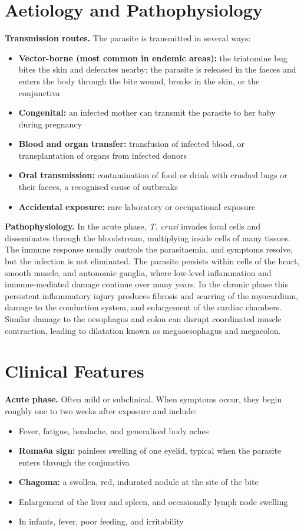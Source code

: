 \section*{Aetiology and Pathophysiology}
\medskip
\textbf{Transmission routes.} The parasite is transmitted in several ways:
\begin{itemize}
    \item \textbf{Vector-borne (most common in endemic areas):} the triatomine bug bites the skin and defecates nearby; the parasite is released in the faeces and enters the body through the bite wound, breaks in the skin, or the conjunctiva
    \item \textbf{Congenital:} an infected mother can transmit the parasite to her baby during pregnancy
    \item \textbf{Blood and organ transfer:} transfusion of infected blood, or transplantation of organs from infected donors
    \item \textbf{Oral transmission:} contamination of food or drink with crushed bugs or their faeces, a recognised cause of outbreaks
    \item \textbf{Accidental exposure:} rare laboratory or occupational exposure
\end{itemize}

\medskip
\textbf{Pathophysiology.} In the acute phase, \textit{T. cruzi} invades local cells and disseminates through the bloodstream, multiplying inside cells of many tissues. The immune response usually controls the parasitaemia, and symptoms resolve, but the infection is not eliminated. The parasite persists within cells of the heart, smooth muscle, and autonomic ganglia, where low-level inflammation and immune-mediated damage continue over many years. In the chronic phase this persistent inflammatory injury produces fibrosis and scarring of the myocardium, damage to the conduction system, and enlargement of the cardiac chambers. Similar damage to the oesophagus and colon can disrupt coordinated muscle contraction, leading to dilatation known as megaoesophagus and megacolon.

\section*{Clinical Features}
\medskip
\textbf{Acute phase.} Often mild or subclinical. When symptoms occur, they begin roughly one to two weeks after exposure and include:
\begin{itemize}
    \item Fever, fatigue, headache, and generalised body aches
    \item \textbf{Roma\~na sign:} painless swelling of one eyelid, typical when the parasite enters through the conjunctiva
    \item \textbf{Chagoma:} a swollen, red, indurated nodule at the site of the bite
    \item Enlargement of the liver and spleen, and occasionally lymph node swelling
    \item In infants, fever, poor feeding, and irritability
\end{itemize}

